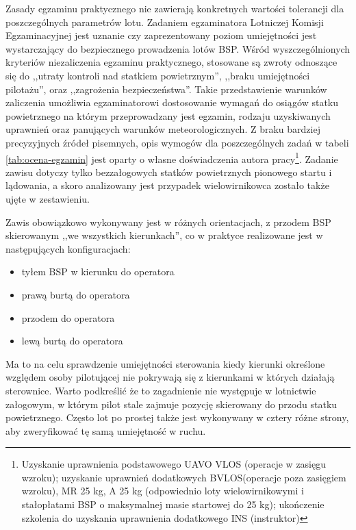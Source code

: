 Zasady egzaminu praktycznego nie zawierają konkretnych wartości tolerancji dla poszczególnych parametrów lotu. Zadaniem egzaminatora Lotniczej Komisji Egzaminacyjnej jest uznanie czy zaprezentowany poziom umiejętności jest wystarczający do bezpiecznego prowadzenia lotów BSP. Wśród wyszczególnionych kryteriów niezaliczenia egzaminu praktycznego, stosowane są zwroty odnoszące się do ,,utraty kontroli nad statkiem powietrznym'', ,,braku umiejętności pilotażu'', oraz ,,zagrożenia bezpieczeństwa''. Takie przedstawienie warunków zaliczenia umożliwia egzaminatorowi dostosowanie wymagań do osiągów statku powietrznego na którym przeprowadzany jest egzamin, rodzaju uzyskiwanych uprawnień oraz panujących warunków meteorologicznych. Z braku bardziej precyzyjnych źródeł pisemnych, opis wymogów dla poszczególnych zadań w tabeli \ref{tab:ocena-egzamin} jest oparty o własne doświadczenia autora pracy\footnote{Uzyskanie uprawnienia podstawowego UAVO VLOS (operacje w zasięgu wzroku); uzyskanie uprawnień dodatkowych BVLOS(operacje poza zasięgiem wzroku), MR 25 kg, A 25 kg (odpowiednio loty wielowirnikowymi i stałopłatami BSP o maksymalnej masie startowej do 25 kg); ukończenie szkolenia do uzyskania uprawnienia dodatkowego INS (instruktor)}. Zadanie zawisu dotyczy tylko bezzałogowych statków powietrznych pionowego startu i lądowania, a skoro analizowany jest przypadek wielowirnikowca zostało także ujęte w zestawieniu.

Zawis obowiązkowo wykonywany jest w różnych orientacjach, z przodem BSP skierowanym ,,we wszystkich kierunkach'', co w praktyce realizowane jest w następujących konfiguracjach:
\begin{itemize}
    \item tyłem BSP w kierunku do operatora
    \item prawą burtą do operatora
    \item przodem do operatora
    \item lewą burtą do operatora
\end{itemize}
Ma to na celu sprawdzenie umiejętności sterowania kiedy kierunki określone względem osoby pilotującej nie pokrywają się z kierunkami w których działają sterownice. Warto podkreślić że to zagadnienie nie występuje w lotnictwie załogowym, w którym pilot stale zajmuje pozycję skierowany do przodu statku powietrznego. Często lot po prostej także jest wykonywany w cztery różne strony, aby zweryfikować tę samą umiejętność w ruchu.

